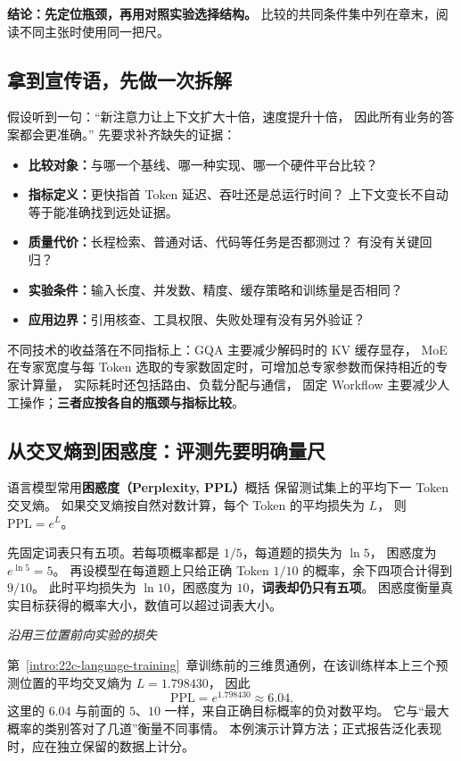\textbf{结论：先定位瓶颈，再用对照实验选择结构。}
比较的共同条件集中列在章末，阅读不同主张时使用同一把尺。

\subsection{拿到宣传语，先做一次拆解}

假设听到一句：“新注意力让上下文扩大十倍，速度提升十倍，
因此所有业务的答案都会更准确。”
先要求补齐缺失的证据：
\begin{itemize}
\item \textbf{比较对象：}与哪一个基线、哪一种实现、哪一个硬件平台比较？
\item \textbf{指标定义：}更快指首 Token 延迟、吞吐还是总运行时间？
上下文变长不自动等于能准确找到远处证据。
\item \textbf{质量代价：}长程检索、普通对话、代码等任务是否都测过？
有没有关键回归？
\item \textbf{实验条件：}输入长度、并发数、精度、缓存策略和训练量是否相同？
\item \textbf{应用边界：}引用核查、工具权限、失败处理有没有另外验证？
\end{itemize}
不同技术的收益落在不同指标上：GQA 主要减少解码时的 KV 缓存显存，
MoE 在专家宽度与每 Token 选取的专家数固定时，可增加总专家参数而保持相近的专家计算量，
实际耗时还包括路由、负载分配与通信，
固定 Workflow 主要减少人工操作；\textbf{三者应按各自的瓶颈与指标比较}。


\subsection{从交叉熵到困惑度：评测先要明确量尺}
\label{concept:perplexity}

语言模型常用\textbf{困惑度（Perplexity, PPL）}概括
保留测试集上的平均下一 Token 交叉熵。
如果交叉熵按自然对数计算，每个 Token 的平均损失为 $L$，
则 $\mathrm{PPL}=e^L$。

先固定词表只有五项。若每项概率都是 $1/5$，每道题的损失为 $\ln5$，
困惑度为 $e^{\ln5}=5$。
再设模型在每道题上只给正确 Token $1/10$ 的概率，余下四项合计得到 $9/10$。
此时平均损失为 $\ln10$，困惑度为 $10$，\textbf{词表却仍只有五项}。
困惑度衡量真实目标获得的概率大小，数值可以超过词表大小。

\begin{example}[breakable=false]
\noindent\emph{沿用三位置前向实验的损失}\par
第~\ref*{intro:22c-language-training}~章训练前的三维贯通例，在该训练样本上三个预测位置的平均交叉熵为 $L=1.798430$，
因此
\[
\mathrm{PPL}=e^{1.798430}\approx 6.04.
\]
这里的 $6.04$ 与前面的 $5$、$10$ 一样，来自正确目标概率的负对数平均。
它与“最大概率的类别答对了几道”衡量不同事情。
本例演示计算方法；正式报告泛化表现时，应在独立保留的数据上计分。
\end{example}

